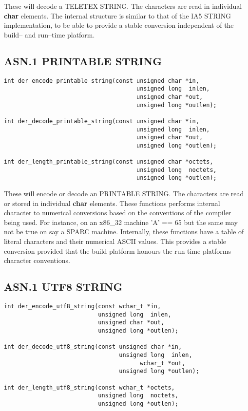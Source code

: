 \documentclass[synpaper]{book}
\begin{document}
These will decode a TELETEX STRING.
The characters are read in individual \textbf{char} elements.
The internal structure is similar to that of the IA5 STRING implementation, to
be able to provide a stable conversion independent of the build-- and run--time
platform.

\subsection{ASN.1 PRINTABLE STRING}

\begin{verbatim}
int der_encode_printable_string(const unsigned char *in,
                                      unsigned long  inlen,
                                      unsigned char *out,
                                      unsigned long *outlen);

int der_decode_printable_string(const unsigned char *in,
                                      unsigned long  inlen,
                                      unsigned char *out,
                                      unsigned long *outlen);

int der_length_printable_string(const unsigned char *octets,
                                      unsigned long  noctets,
                                      unsigned long *outlen);
\end{verbatim}

These will encode or decode an PRINTABLE STRING.  The characters are read or stored in individual \textbf{char} elements.  These functions performs internal character
to numerical conversions based on the conventions of the compiler being used.  For instance, on an x86\_32 machine 'A' == 65 but the same may not be true on
say a SPARC machine.  Internally, these functions have a table of literal characters and their numerical ASCII values.  This provides a stable conversion provided
that the build platform honours the run-time platforms character conventions.

\subsection{ASN.1 UTF8 STRING}

\begin{verbatim}
int der_encode_utf8_string(const wchar_t *in,
                           unsigned long  inlen,
                           unsigned char *out,
                           unsigned long *outlen);

int der_decode_utf8_string(const unsigned char *in,
                                 unsigned long  inlen,
                                       wchar_t *out,
                                 unsigned long *outlen);

int der_length_utf8_string(const wchar_t *octets,
                           unsigned long  noctets,
                           unsigned long *outlen);
\end{verbatim}
\end{document}
